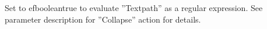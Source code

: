     Set to \jb{}efbooleantrue to evaluate ''Textpath'' as a
  regular expression. See parameter description for ''Collapse''
  action for details.
